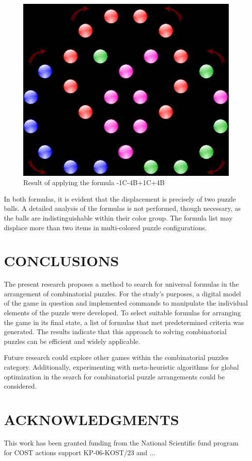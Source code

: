 \documentclass[a4paper,twocolumn,10pt]{article}
\begin{document}
\begin{figure}
	\centering
	\includegraphics[width=1.0\linewidth]{figure03.png}
	\caption{Result of applying the formula -1C-4B+1C+4B}
	\label{figure03}
\end{figure}

In both formulas, it is evident that the displacement is precisely of two puzzle balls. A detailed analysis of the formulas is not performed, though necessary, as the balls are indistinguishable within their color group. The formula list may displace more than two items in multi-colored puzzle configurations.

\section{CONCLUSIONS}

The present research proposes a method to search for universal formulas in the arrangement of combinatorial puzzles. For the study's purposes, a digital model of the game in question and implemented commands to manipulate the individual elements of the puzzle were developed. To select suitable formulas for arranging the game in its final state, a list of formulas that met predetermined criteria was generated. The results indicate that this approach to solving combinatorial puzzles can be efficient and widely applicable.

Future research could explore other games within the combinatorial puzzles category. Additionally, experimenting with meta-heuristic algorithms for global optimization in the search for combinatorial puzzle arrangements could be considered.

\section{ACKNOWLEDGMENTS}

This work has been granted funding from the National Scientific fund program for COST actions support KP-06-KOST/23 and ...



\end{document}
